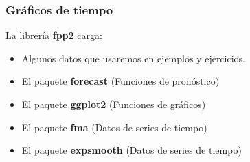 \documentclass[10pt]{beamer}
\begin{document}






\begin{frame}[fragile]
\frametitle{Gráficos de tiempo}


La librería \textbf{fpp2} carga:

\vspace{4mm}

\begin{itemize}
\item Algunos datos que usaremos en ejemplos y ejercicios.
\vspace{3mm}
\item El paquete \textbf{forecast} (Funciones de pronóstico)
\vspace{3mm}
\item El paquete \textbf{ggplot2} (Funciones de gráficos)
\vspace{3mm}
\item El paquete \textbf{fma} (Datos de series de tiempo)
\vspace{3mm}
\item El paquete \textbf{expsmooth} (Datos de series de tiempo)
\end{itemize}


\end{frame}


\end{document}
